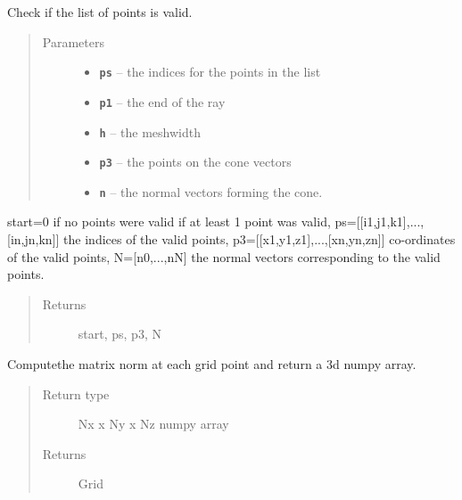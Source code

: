 \documentclass[letterpaper,10pt,english]{sphinxmanual}
\begin{document}
\begin{fulllineitems}
\begin{fulllineitems}
\label{index:DictionarySparseMatrix.DS.stopchecklist}
Check if the list of points is valid.
\begin{quote}\begin{description}
\item[{Parameters}] \leavevmode\begin{itemize}
\item {} 
\textbf{\texttt{ps}} -- the indices for the points in the list

\item {} 
\textbf{\texttt{p1}} -- the end of the ray

\item {} 
\textbf{\texttt{h}} -- the meshwidth

\item {} 
\textbf{\texttt{p3}} -- the points on the cone vectors

\item {} 
\textbf{\texttt{n}} -- the normal vectors forming the cone.

\end{itemize}

\end{description}\end{quote}

start=0 if no points were valid if at least 1 point was valid,
ps={[}{[}i1,j1,k1{]},...,{[}in,jn,kn{]}{]} the indices of the valid points,
p3={[}{[}x1,y1,z1{]},...,{[}xn,yn,zn{]}{]} co-ordinates of the valid points,
N={[}n0,...,nN{]} the normal vectors corresponding to the valid points.
\begin{quote}\begin{description}
\item[{Returns}] \leavevmode
start, ps, p3, N

\end{description}\end{quote}

\end{fulllineitems}


\begin{fulllineitems}
\label{index:DictionarySparseMatrix.DS.togrid}
Computethe matrix norm at each grid point and return a     3d numpy array.
\begin{quote}\begin{description}
\item[{Return type}] \leavevmode
Nx x Ny x Nz numpy array

\item[{Returns}] \leavevmode
Grid

\end{description}\end{quote}

\end{fulllineitems}


\end{fulllineitems}
\end{document}
